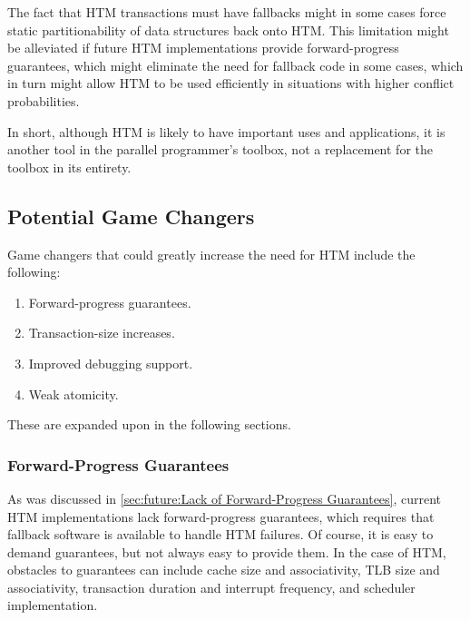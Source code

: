 The fact that HTM transactions must have fallbacks might in some cases
force static partitionability of data structures back onto HTM\@.
This limitation might be alleviated if future HTM implementations
provide forward-progress guarantees, which might eliminate the need
for fallback code in some cases, which in turn might allow HTM to
be used efficiently in situations with higher conflict probabilities.

In short, although HTM is likely to have important uses and applications,
it is another tool in the parallel programmer's toolbox, not a replacement
for the toolbox in its entirety.

\subsection{Potential Game Changers}
\label{sec:future:Potential Game Changers}

Game changers that could greatly increase the need for HTM include
the following:

\begin{enumerate}
\item	Forward-progress guarantees.
\item	Transaction-size increases.
\item	Improved debugging support.
\item	Weak atomicity.
\end{enumerate}

These are expanded upon in the following sections.

\subsubsection{Forward-Progress Guarantees}
\label{sec:future:Forward-Progress Guarantees}

As was discussed in
\cref{sec:future:Lack of Forward-Progress Guarantees},
current HTM implementations lack forward-progress guarantees, which requires
that fallback software is available to handle HTM failures.
Of course, it is easy to demand guarantees, but not always easy
to provide them.
In the case of HTM, obstacles to guarantees can include cache size and
associativity, TLB size and associativity, transaction duration and
interrupt frequency, and scheduler implementation.


